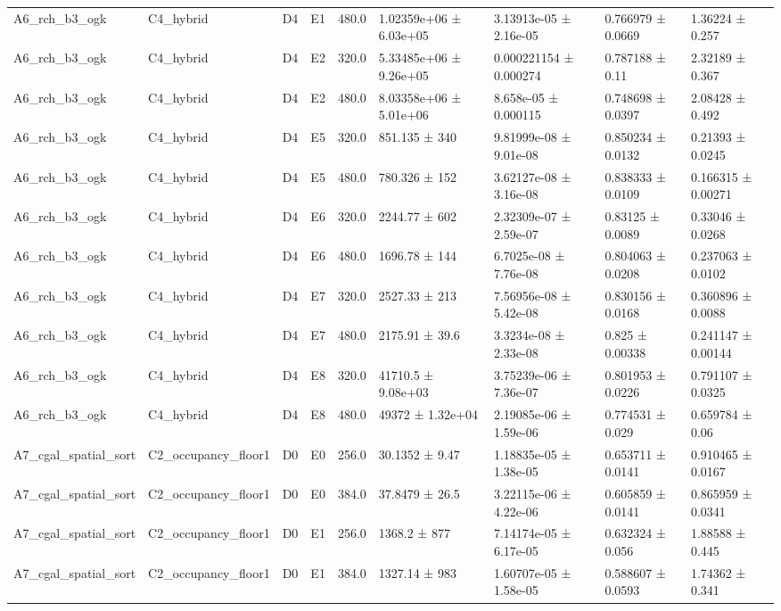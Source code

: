 \begin{table}
\begin{tabular}{lllllllll}
A6\_rch\_b3\_ogk & C4\_hybrid & D4 & E1 & 480.0 & 1.02359e+06 ± 6.03e+05 & 3.13913e-05 ± 2.16e-05 & 0.766979 ± 0.0669 & 1.36224 ± 0.257 \\
A6\_rch\_b3\_ogk & C4\_hybrid & D4 & E2 & 320.0 & 5.33485e+06 ± 9.26e+05 & 0.000221154 ± 0.000274 & 0.787188 ± 0.11 & 2.32189 ± 0.367 \\
A6\_rch\_b3\_ogk & C4\_hybrid & D4 & E2 & 480.0 & 8.03358e+06 ± 5.01e+06 & 8.658e-05 ± 0.000115 & 0.748698 ± 0.0397 & 2.08428 ± 0.492 \\
A6\_rch\_b3\_ogk & C4\_hybrid & D4 & E5 & 320.0 & 851.135 ± 340 & 9.81999e-08 ± 9.01e-08 & 0.850234 ± 0.0132 & 0.21393 ± 0.0245 \\
A6\_rch\_b3\_ogk & C4\_hybrid & D4 & E5 & 480.0 & 780.326 ± 152 & 3.62127e-08 ± 3.16e-08 & 0.838333 ± 0.0109 & 0.166315 ± 0.00271 \\
A6\_rch\_b3\_ogk & C4\_hybrid & D4 & E6 & 320.0 & 2244.77 ± 602 & 2.32309e-07 ± 2.59e-07 & 0.83125 ± 0.0089 & 0.33046 ± 0.0268 \\
A6\_rch\_b3\_ogk & C4\_hybrid & D4 & E6 & 480.0 & 1696.78 ± 144 & 6.7025e-08 ± 7.76e-08 & 0.804063 ± 0.0208 & 0.237063 ± 0.0102 \\
A6\_rch\_b3\_ogk & C4\_hybrid & D4 & E7 & 320.0 & 2527.33 ± 213 & 7.56956e-08 ± 5.42e-08 & 0.830156 ± 0.0168 & 0.360896 ± 0.0088 \\
A6\_rch\_b3\_ogk & C4\_hybrid & D4 & E7 & 480.0 & 2175.91 ± 39.6 & 3.3234e-08 ± 2.33e-08 & 0.825 ± 0.00338 & 0.241147 ± 0.00144 \\
A6\_rch\_b3\_ogk & C4\_hybrid & D4 & E8 & 320.0 & 41710.5 ± 9.08e+03 & 3.75239e-06 ± 7.36e-07 & 0.801953 ± 0.0226 & 0.791107 ± 0.0325 \\
A6\_rch\_b3\_ogk & C4\_hybrid & D4 & E8 & 480.0 & 49372 ± 1.32e+04 & 2.19085e-06 ± 1.59e-06 & 0.774531 ± 0.029 & 0.659784 ± 0.06 \\
A7\_cgal\_spatial\_sort & C2\_occupancy\_floor1 & D0 & E0 & 256.0 & 30.1352 ± 9.47 & 1.18835e-05 ± 1.38e-05 & 0.653711 ± 0.0141 & 0.910465 ± 0.0167 \\
A7\_cgal\_spatial\_sort & C2\_occupancy\_floor1 & D0 & E0 & 384.0 & 37.8479 ± 26.5 & 3.22115e-06 ± 4.22e-06 & 0.605859 ± 0.0141 & 0.865959 ± 0.0341 \\
A7\_cgal\_spatial\_sort & C2\_occupancy\_floor1 & D0 & E1 & 256.0 & 1368.2 ± 877 & 7.14174e-05 ± 6.17e-05 & 0.632324 ± 0.056 & 1.88588 ± 0.445 \\
A7\_cgal\_spatial\_sort & C2\_occupancy\_floor1 & D0 & E1 & 384.0 & 1327.14 ± 983 & 1.60707e-05 ± 1.58e-05 & 0.588607 ± 0.0593 & 1.74362 ± 0.341 \\

\end{tabular}
\end{table}
